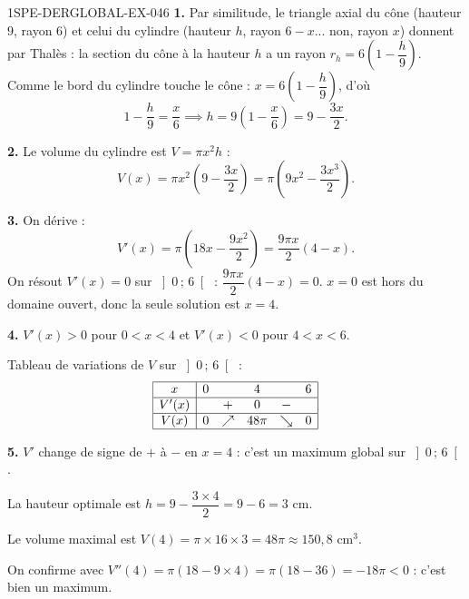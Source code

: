 \begin{corrige}{1SPE-DERGLOBAL-EX-046}
\textbf{1.} Par similitude, le triangle axial du cône (hauteur $9$, rayon $6$)
et celui du cylindre (hauteur $h$, rayon $6 - x$... non, rayon $x$) donnent par Thalès :
la section du cône à la hauteur $h$ a un rayon $r_h = 6\!\left(1 - \dfrac{h}{9}\right)$.
Comme le bord du cylindre touche le cône : $x = 6\!\left(1 - \dfrac{h}{9}\right)$, d'où
\[
1 - \frac{h}{9} = \frac{x}{6} \implies h = 9\!\left(1 - \frac{x}{6}\right) = 9 - \frac{3x}{2}.
\]

\textbf{2.} Le volume du cylindre est $V = \pi x^2 h$ :
\[
V(x) = \pi x^2\!\left(9 - \frac{3x}{2}\right) = \pi\!\left(9x^2 - \frac{3x^3}{2}\right).
\]

\textbf{3.} On dérive :
\[
V'(x) = \pi\!\left(18x - \frac{9x^2}{2}\right) = \frac{9\pi x}{2}(4 - x).
\]
On résout $V'(x) = 0$ sur $\left]0\,;\,6\right[$ : $\dfrac{9\pi x}{2}(4 - x) = 0$.
$x = 0$ est hors du domaine ouvert, donc la seule solution est $x = 4$.

\textbf{4.} $V'(x) > 0$ pour $0 < x < 4$ et $V'(x) < 0$ pour $4 < x < 6$.

Tableau de variations de $V$ sur $\left]0\,;\,6\right[$ :
\[
\begin{array}{|c|ccccc|}
\hline
x     & 0 & & 4 & & 6 \\
\hline
V'(x) &   & + & 0 & - & \\
\hline
V(x)  & 0 & \nearrow & 48\pi & \searrow & 0 \\
\hline
\end{array}
\]

\textbf{5.} $V'$ change de signe de $+$ à $-$ en $x = 4$ : c'est un maximum global sur $\left]0\,;\,6\right[$.

La hauteur optimale est $h = 9 - \dfrac{3 \times 4}{2} = 9 - 6 = 3$ cm.

Le volume maximal est $V(4) = \pi \times 16 \times 3 = \boxed{48\pi \approx 150{,}8 \text{ cm}^3}$.

On confirme avec $V''(4) = \pi(18 - 9 \times 4) = \pi(18 - 36) = -18\pi < 0$ : c'est bien un maximum.
\end{corrige}
